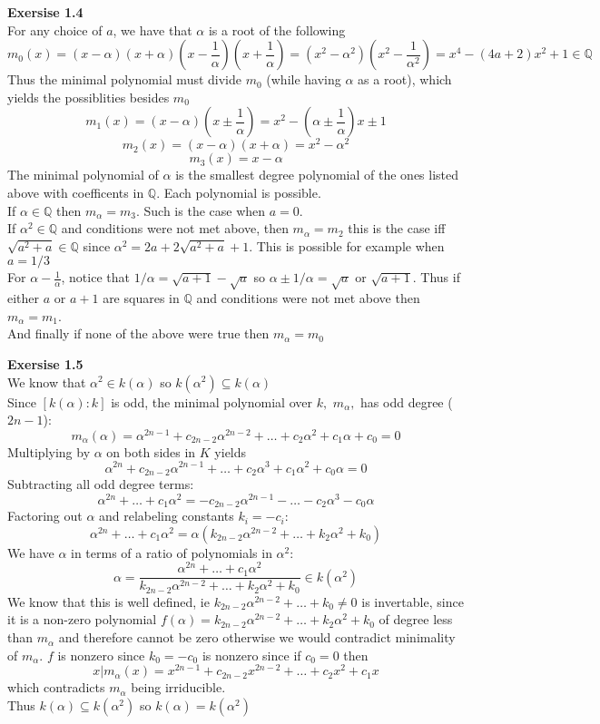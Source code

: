 \documentclass[12pt]{article}
\newenvironment{ques}[1]{\textbf{Exersise #1}\vspace{1 mm}\\ }{\bigskip}
\theoremstyle{definition}
\newcommand{\Q}{\mathbb Q}
\renewcommand{\a}{\alpha}
\begin{document}
\begin{ques}{1.4}
	For any choice of $a$, we have that $\a$ is a root of the following
	$$m_0(x) = (x - \a)(x + \a)(x -\frac 1 \a)(x + \frac 1 \a) = (x^2 - \a^2)(x^2
	- \frac 1 {\a^2}) = x^4 - (4a + 2)x^2 + 1 \in \Q$$
	Thus the minimal polynomial must divide $m_0$ (while having $\a$ as a root),
	which yields the possiblities besides $m_0$
	$$m_1(x) = (x - \a)(x \pm \frac 1 \a) = x^2 - (\a \pm \frac 1 \a)x \pm 1$$
	$$m_2(x) = (x - \a)(x + \a) = x^2 - \a^2$$
	$$m_3(x) = x - \a$$
	The minimal polynomial of $\a$ is the smallest degree polynomial of the
	ones listed above with coefficents in $\Q$. Each polynomial is possible. \\
	If $\a \in \Q$ then $m_\a = m_3$. Such is the case when $a = 0$.\\ 
	If $\a^2
	\in \Q$ and conditions were not met above, then $m_\a = m_2$ this is the
	case iff $\sqrt{a^2 + a} \in \Q$ since $\a^2 = 2a + 2\sqrt{a^2 + a} + 1$.
	This is possible for example when $a = 1/3$\\ 
	For $\a - \frac 1 \a$, notice that $1/\a = \sqrt {a
	+ 1} - \sqrt a$ so $\a \pm 1/\a = \sqrt a$ or $\sqrt {a + 1}$. Thus if
	either $a$ or $a + 1$ are squares in $\Q$ and conditions were not met above
	then $m_\a = m_1$.\\ 
	And finally if none of the above were true then $m_\a
	= m_0$
\end{ques}

\begin{ques}{1.5}
	We know that $\a ^2 \in k(\a)$ so $k(\a^2) \subseteq k(\a)$\\
	Since $[k(\a): k]$ is odd, the minimal polynomial over $k,$ $m_\a,$ has odd
	degree ($2n-1$):
	$$m_\a(\a) = \a^{2n -1} + c_{2n-2}\a^{2n-2}+ \dots +c_2\a ^2 +c_1\a +
	c_0 = 0$$ 
	Multiplying by $\a$ on both sides in $K$ yields
	$$\a^{2n} + c_{2n-2}\a^{2n-1}+ \dots +c_2\a ^3 +c_1\a^2 +
	c_0\a = 0$$ 
	Subtracting all odd degree terms:
	$$\a^{2n} + \dots +c_1\a^2 = -c_{2n-2}\a^{2n-1} - \dots - c_2\a^3 - c_0\a$$ 
	Factoring out $\a$ and relabeling constants $k_i = -c_i$:
	$$\a^{2n} + \dots +c_1\a^2 = \a(k_{2n-2}\a^{2n-2} + \dots + k_2\a^2 + k_0)$$
	We have $\a$ in terms of a ratio of polynomials in $\a^2$:
	$$\a = \frac{\a^{2n} + \dots +c_1\a^2}{k_{2n-2}\a^{2n-2} + \dots +
	k_2\a^2 + k_0} \in k(\a^2)$$
	We know that this is well defined, ie $k_{2n-2}\a^{2n-2} + \dots + k_0 \neq 0$ is
	invertable, since it is a non-zero polynomial $f(\a) = k_{2n-2}\a^{2n-2} +
	\dots + k_2\a^2 + k_0$ of degree less than $m_\a$ and therefore cannot be
	zero otherwise we would contradict minimality of $m_\a$. $f$ is nonzero
	since $k_0 = -c_0$ is nonzero since if $c_0 = 0$ then 
	$$x|m_\a(x) = x^{2n -1} + c_{2n-2}x^{2n-2}+ \dots +c_2x ^2 +c_1x$$
	which contradicts $m_\a$ being irriducible.\\ Thus $k(\a) \subseteq
	k(\a^2)$ so $k(\a) = k(\a^2)$
\end{ques}
\end{document}
